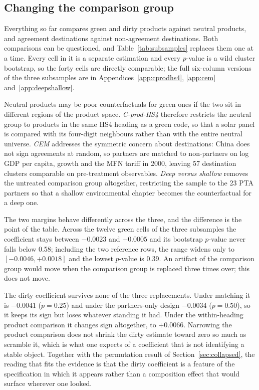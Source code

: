 \documentclass[12pt]{article}
\begin{document}






\FloatBarrier
\subsection{Changing the comparison group}\label{sec:comparison}

Everything so far compares green and dirty products against neutral products, and agreement
destinations against non-agreement destinations. Both comparisons can be questioned, and
Table~\ref{tab:subsamples} replaces them one at a time. Every cell in it is a separate estimation and
every $p$-value is a wild cluster bootstrap, so the forty cells are directly comparable; the full
six-column versions of the three subsamples are in Appendices~\ref{app:cprodhs4}, \ref{app:cem}
and~\ref{app:deepshallow}.

Neutral products may be poor counterfactuals for green ones if the two sit in different regions of
the product space. \emph{C-prod-HS4} therefore restricts the neutral group to products in the same HS4
heading as a green code, so that a solar panel is compared with its four-digit neighbours rather
than with the entire neutral universe. \emph{CEM} addresses the symmetric concern
about destinations: China does not sign agreements at random, so partners are matched to
non-partners on log GDP per capita, growth and the MFN tariff in 2000, leaving 57 destination
clusters comparable on pre-treatment observables. \emph{Deep versus shallow} removes the untreated
comparison group altogether, restricting the sample to the 23 PTA partners so that a shallow
environmental chapter becomes the counterfactual for a deep one.

The two margins behave differently across the three, and the difference is the point of the table.
Across the twelve green cells of the three subsamples the coefficient stays between $-0.0023$ and
$+0.0005$ and its bootstrap $p$-value never falls below 0.58; including the two reference rows, the
range widens only to $[-0.0046, +0.0018]$ and the lowest $p$-value is 0.39. An artifact of the comparison group would move when the
comparison group is replaced three times over; this does not move.

The dirty coefficient survives none of the three replacements. Under matching it is $-0.0041$
($p = 0.25$) and under the partners-only design $-0.0034$ ($p = 0.50$), so it keeps its sign but
loses whatever standing it had. Under the within-heading product comparison it changes sign
altogether, to $+0.0066$. Narrowing the product comparison does not shrink the dirty estimate toward
zero so much as scramble it, which is what one expects of a coefficient that is not identifying a
stable object. Together with the permutation result of Section~\ref{sec:collapsed}, the reading that
fits the evidence is that the dirty coefficient is a feature of the specification in which it appears
rather than a composition effect that would surface wherever one looked.
\end{document}
